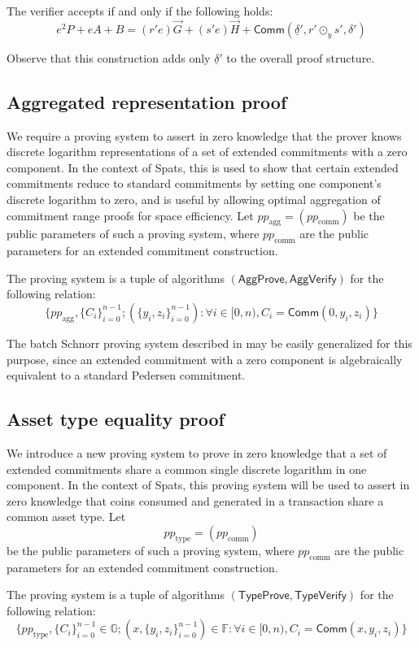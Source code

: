\documentclass{article}
\newcommand{\G}{\mathbb{G}}
\newcommand{\F}{\mathbb{F}}
\newcommand{\func}[1]{\mathsf{#1}}
\newcommand{\comm}{\func{Comm}}
\begin{document}
The verifier accepts if and only if the following holds:
$$e^2 P + eA + B = (r'e)\vec{G} + (s'e)\vec{H} + \comm(\underline{\delta}', r' \odot_y s', \delta')$$

Observe that this construction adds only $\underline{\delta}'$ to the overall proof structure.


\subsection{Aggregated representation proof}

We require a proving system to assert in zero knowledge that the prover knows discrete logarithm representations of a set of extended commitments with a zero component.
In the context of Spats, this is used to show that certain extended commitments reduce to standard commitments by setting one component's discrete logarithm to zero, and is useful by allowing optimal aggregation of commitment range proofs for space efficiency.
Let $pp_{\text{agg}} = (pp_{\text{comm}})$ be the public parameters of such a proving system, where $pp_{\text{comm}}$ are the public parameters for an extended commitment construction.

The proving system is a tuple of algorithms $(\func{AggProve}, \func{AggVerify})$ for the following relation:
$$\{ pp_{\text{agg}}, \{C_i\}_{i=0}^{n-1} ; (\{y_i, z_i\}_{i=0}^{n-1}) : \forall i \in [0,n), C_i = \comm(0, y_i, z_i) \}$$

The batch Schnorr proving system described in \cite{batch_schnorr} may be easily generalized for this purpose, since an extended commitment with a zero component is algebraically equivalent to a standard Pedersen commitment.


\subsection{Asset type equality proof}

We introduce a new proving system to prove in zero knowledge that a set of extended commitments share a common single discrete logarithm in one component.
In the context of Spats, this proving system will be used to assert in zero knowledge that coins consumed and generated in a transaction share a common asset type.
Let $$pp_{\text{type}} = (pp_{\text{comm}})$$ be the public parameters of such a proving system, where $pp_{\text{comm}}$ are the public parameters for an extended commitment construction.

The proving system is a tuple of algorithms $(\func{TypeProve}, \func{TypeVerify})$ for the following relation:
$$\{ pp_{\text{type}}, \{C_i\}_{i=0}^{n-1} \in \G ; (x, \{y_i, z_i\}_{i=0}^{n-1}) \in \F : \forall i \in [0,n), C_i = \comm(x, y_i, z_i) \}$$
\end{document}
